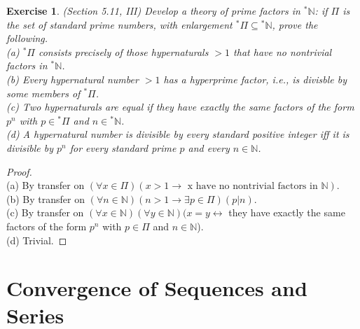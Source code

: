\documentclass[a4paper, 11pt]{book}
\theoremstyle{plain}
\newtheorem{exercise}{Exercise}[chapter]
\theoremstyle{plain}
\newcommand{\N}{\mathbb{N}}
\newcommand{\hyp}{{}^*}
\begin{document}
  \begin{exercise}
    (Section 5.11, III)
    Develop a theory of prime factors in $\hyp \N$: if $\Pi$ is the set of standard prime numbers, with enlargement $\hyp \Pi \subseteq \hyp \N$, prove the following. \\
    (a) $\hyp \Pi$ consists precisely of those hypernaturals $>1$ that have no nontrivial factors in $\hyp \N$. \\
    (b) Every hypernatural number $>1$ has a hyperprime factor, i.e., is divisble by some members of $\hyp \Pi$. \\
    (c) Two hypernaturals are equal if they have exactly the same factors of the form $p^n$ with $p \in \hyp \Pi$ and $n \in \hyp \N$. \\
    (d) A hypernatural number is divisible by every standard positive integer iff it is divisible by $p^n$ for every standard prime $p$ and every $n \in \N$.
  \end{exercise}
  \begin{proof} $ $ \\
    (a) By transfer on $(\forall x \in \Pi) (x>1 \rightarrow \text{ x have no nontrivial factors in } \N)$. \\
    (b) By transfer on $(\forall n \in \N)(n>1 \rightarrow \exists p \in \Pi)(p|n)$.  \\
    (c) By transfer on $(\forall x \in \N)(\forall y \in \N)(x=y \leftrightarrow$ they have exactly the same factors of the form $p^n$ with $p \in \Pi$ and $n \in \N$). \\
    (d) Trivial.
  \end{proof}

\chapter{Convergence of Sequences and Series}
\end{document}
